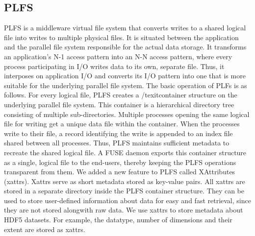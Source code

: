 \subsection{PLFS}
PLFS is a middleware virtual file system that converts writes to a shared logical file into writes to multiple physical files. 
It is situated between the application and the parallel file system responsible for the actual data storage. 
It transforms an application's N-1 access pattern into an N-N access pattern, where every process participating in I/O writes data to its own, separate file. 
Thus, it interposes on application I/O and converts its I/O pattern into one that is more suitable for the underlying parallel file system.
The basic operation of PLFs is as follows. For every logical file, PLFS creates a /texit{container} structure on the underlying parallel file system. 
This container is a hierarchical directory tree consisting of multiple sub-directories. Multiple processes opening the same logical file for writing get a unique data file within the container. When the processes write to their file, a record identifying the write is appended to an index file shared between all processes. Thus, PLFS maintains sufficient metadata to recreate the shared logical file. A FUSE daemon exports this container structure as a single, logical file to the end-users, thereby keeping the PLFS operations transparent from them. 
We added a new feature to PLFS called XAttributes (xattrs). Xattrs serve as short metadata stored as key-value pairs.
All xattrs are stored in a separate directory inside the PLFS container structure. They can be used to store user-defined information about data for easy and fast retrieval, since they are not stored alongwith raw data. 
We use xattrs to store metadata about HDF5 datasets. For example, the datatype, number of dimensions and their extent are stored as xattrs. 
